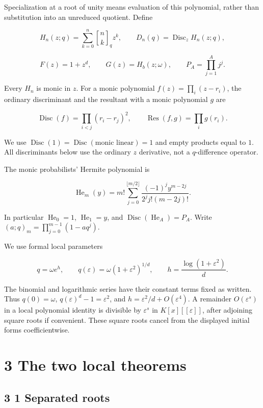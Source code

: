 \documentclass[
  11pt,
]{article}
\begin{document}
Specialization at a root of unity means evaluation of this polynomial,
rather than substitution into an unreduced quotient. Define

\[
H_n(z;q)=\sum_{k=0}^{n}\genfrac{[}{]}{0pt}{}{n}{k}_q z^k,
\qquad D_n(q)=\operatorname{Disc}_z H_n(z;q),
\]

\[
F(z)=1+z^d,\qquad G(z)=H_b(z;\omega),\qquad
P_A=\prod_{j=1}^{A}j^j.
\]

Every \(H_n\) is monic in \(z\). For a monic polynomial
\(f(z)=\prod_i(z-r_i)\), the ordinary discriminant and the resultant
with a monic polynomial \(g\) are

\[
\operatorname{Disc}(f)=\prod_{i<j}(r_i-r_j)^2,
\qquad \operatorname{Res}(f,g)=\prod_i g(r_i).
\]

We use
\(\operatorname{Disc}(1)=\operatorname{Disc}(\text{monic linear})=1\)
and empty products equal to \(1\). All discriminants below use the
ordinary \(z\) derivative, not a \(q\)-difference operator.

The monic probabilists' Hermite polynomial is

\[
\operatorname{He}_m(y)=m!\sum_{j=0}^{\lfloor m/2\rfloor}
\frac{(-1)^j y^{m-2j}}{2^j j!(m-2j)!}.
\]

In particular \(\operatorname{He}_0=1\), \(\operatorname{He}_1=y\), and
\(\operatorname{Disc}(\operatorname{He}_A)=P_A\). Write
\((a;q)_m=\prod_{j=0}^{m-1}(1-aq^j)\).

We use formal local parameters

\[
q=\omega e^h,\qquad q(\varepsilon)=\omega(1+\varepsilon^2)^{1/d},
\qquad h=\frac{\log(1+\varepsilon^2)}{d}.
\]

The binomial and logarithmic series have their constant terms fixed as
written. Thus \(q(0)=\omega\), \(q(\varepsilon)^d-1=\varepsilon^2\), and
\(h=\varepsilon^2/d+O(\varepsilon^4)\). A remainder \(O(\varepsilon^s)\)
in a local polynomial identity is divisible by \(\varepsilon^s\) in
\(K[x][[\varepsilon]]\), after adjoining square roots if convenient.
These square roots cancel from the displayed initial forms
coefficientwise.

\section{3 The two local theorems}\label{the-two-local-theorems}

\subsection{3 1 Separated roots}\label{separated-roots}
\end{document}
